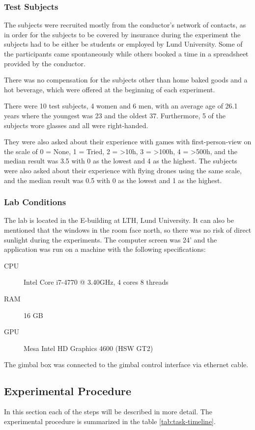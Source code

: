 \documentclass[nofilelist]{cslthse-msc}
\begin{document}
\subsubsection{Test Subjects}
The subjects were recruited mostly from the conductor's network of contacts, as in order for the subjects to be covered by insurance during the experiment the subjects had to be either be students or employed by Lund University. Some of the participants came spontaneously while others booked a time in a spreadsheet provided by the conductor.

There was no compensation for the subjects other than home baked goods and a hot beverage, which were offered at the beginning of each experiment.

There were 10 test subjects, 4 women and 6 men, with an average age of 26.1 years where the youngest was 23 and the oldest 37. Furthermore, 5 of the subjects wore glasses and all were right-handed. 

They were also asked about their experience with games with first-person-view on the scale of 0 = None, 1 = Tried, 2 = >10h, 3 = >100h, 4 = >500h, and the median result was 3.5 with 0 as the lowest and 4 as the highest. The subjects were also asked about their experience with flying drones using the same scale, and the median result was 0.5 with 0 as the lowest and 1 as the highest. 

\subsubsection{Lab Conditions}
The lab is located in the E-building at LTH, Lund University. It can also be mentioned that the windows in the room face north, so there was no risk of direct sunlight during the experiments.
The computer screen was 24' and the application was run on a machine with the following specifications:
\begin{description}
   \item[CPU] Intel Core i7-4770 @ 3.40GHz, 4 cores 8 threads
   \item[RAM] 16 GB
   \item[GPU] Mesa Intel HD Graphics 4600 (HSW GT2)
\end{description}

The gimbal box was connected to the gimbal control interface via ethernet cable.

\subsection{Experimental Procedure}
In this section each of the steps will be described in more detail. The experimental procedure is summarized in the table \ref{tab:task-timeline}.
\end{document}
